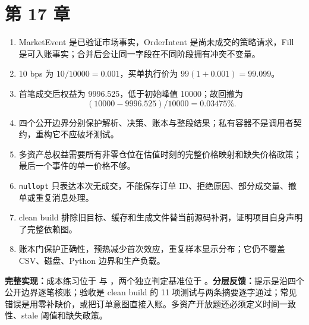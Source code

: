 \section{第 17 章}
\begin{enumerate}
  \item MarketEvent 是已验证市场事实，OrderIntent 是尚未成交的策略请求，Fill 是可入账事实；合并后会让同一字段在不同阶段拥有冲突不变量。
  \item 10 bps 为 \(10/10000=0.001\)，买单执行价为 \(99(1+0.001)=99.099\)。
  \item 首笔成交后权益为 9996.525，低于初始峰值 10000；故回撤为
  \[
    (10000-9996.525)/10000=0.03475\%.
  \]
  \item 四个公开边界分别保护解析、决策、账本与整段结果；私有容器不是调用者契约，重构它不应破坏测试。
  \item 多资产总权益需要所有非零仓位在估值时刻的完整价格映射和缺失价格政策；最后一个事件的单一价格不够。
  \item \texttt{nullopt} 只表达本次无成交，不能保存订单 ID、拒绝原因、部分成交量、撤单或重复消息处理。
  \item clean build 排除旧目标、缓存和生成文件替当前源码补洞，证明项目自身声明了完整依赖图。
  \item 账本门保护正确性，预热减少首次效应，重复样本显示分布；它仍不覆盖 CSV、磁盘、Python 边界和生产负载。
\end{enumerate}

\noindent\textbf{完整实现：}成本练习位于  与 ，两个独立判定基准位于 。\textbf{分层反馈：}提示是沿四个公开边界逐笔核账；验收是 clean build 的 11 项测试与两条摘要逐字通过；常见错误是用零补缺价，或把订单意图直接入账。多资产开放题还必须定义时间一致性、stale 阈值和缺失政策。

